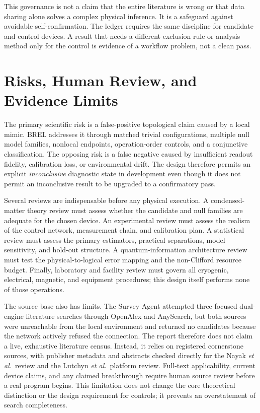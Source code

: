 \documentclass[conference]{IEEEtran}
\begin{document}
This governance is not a claim that the entire literature is wrong or that data sharing alone solves a complex physical inference. It is a safeguard against avoidable self-confirmation. The ledger requires the same discipline for candidate and control devices. A result that needs a different exclusion rule or analysis method only for the control is evidence of a workflow problem, not a clean pass.

\section{Risks, Human Review, and Evidence Limits}

The primary scientific risk is a false-positive topological claim caused by a local mimic. BREL addresses it through matched trivial configurations, multiple null model families, nonlocal endpoints, operation-order controls, and a conjunctive classification. The opposing risk is a false negative caused by insufficient readout fidelity, calibration loss, or environmental drift. The design therefore permits an explicit \emph{inconclusive} diagnostic state in development even though it does not permit an inconclusive result to be upgraded to a confirmatory pass.

Several reviews are indispensable before any physical execution. A condensed-matter theory review must assess whether the candidate and null families are adequate for the chosen device. An experimental review must assess the realism of the control network, measurement chain, and calibration plan. A statistical review must assess the primary estimators, practical separations, model sensitivity, and hold-out structure. A quantum-information architecture review must test the physical-to-logical error mapping and the non-Clifford resource budget. Finally, laboratory and facility review must govern all cryogenic, electrical, magnetic, and equipment procedures; this design itself performs none of those operations.

The source base also has limits. The Survey Agent attempted three focused dual-engine literature searches through OpenAlex and AnySearch, but both sources were unreachable from the local environment and returned no candidates because the network actively refused the connection. The report therefore does not claim a live, exhaustive literature census. Instead, it relies on registered cornerstone sources, with publisher metadata and abstracts checked directly for the Nayak \textit{et al.}\ review and the Lutchyn \textit{et al.}\ platform review. Full-text applicability, current device claims, and any claimed breakthrough require human source review before a real program begins. This limitation does not change the core theoretical distinction or the design requirement for controls; it prevents an overstatement of search completeness.
\end{document}
